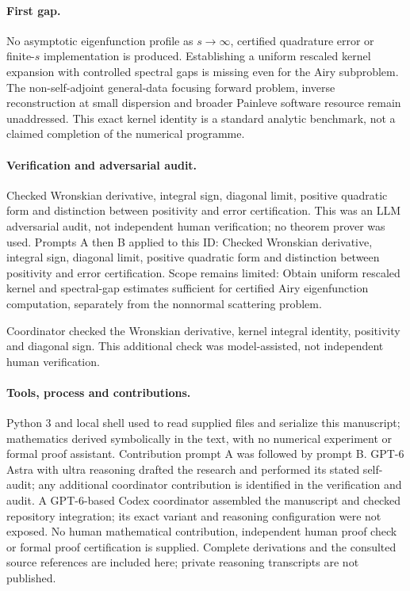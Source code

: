 \documentclass[11pt]{article}
\begin{document}
\paragraph{First gap.}No asymptotic eigenfunction profile as \(s\to\infty\), certified quadrature error or finite-\(s\) implementation is produced. Establishing a uniform rescaled kernel expansion with controlled spectral gaps is missing even for the Airy subproblem. The non-self-adjoint general-data focusing forward problem, inverse reconstruction at small dispersion and broader Painleve software resource remain unaddressed. This exact kernel identity is a standard analytic benchmark, not a claimed completion of the numerical programme.

\paragraph{Verification and adversarial audit.}
Checked Wronskian derivative, integral sign, diagonal limit, positive quadratic form and distinction between positivity and error certification. This was an LLM adversarial audit, not independent human verification; no theorem prover was used. Prompts A then B applied to this ID: Checked Wronskian derivative, integral sign, diagonal limit, positive quadratic form and distinction between positivity and error certification. Scope remains limited: Obtain uniform rescaled kernel and spectral-gap estimates sufficient for certified Airy eigenfunction computation, separately from the nonnormal scattering problem.

Coordinator checked the Wronskian derivative, kernel integral identity, positivity and diagonal sign. This additional check was model-assisted, not independent human verification.

\paragraph{Tools, process and contributions.}
Python 3 and local shell used to read supplied files and serialize this manuscript; mathematics derived symbolically in the text, with no numerical experiment or formal proof assistant. Contribution prompt A was followed by prompt B. GPT-6 Astra with ultra reasoning drafted the research and performed its stated self-audit; any additional coordinator contribution is identified in the verification and audit. A GPT-6-based Codex coordinator assembled the manuscript and checked repository integration; its exact variant and reasoning configuration were not exposed. No human mathematical contribution, independent human proof check or formal proof certification is supplied. Complete derivations and the consulted source references are included here; private reasoning transcripts are not published.
\end{document}
